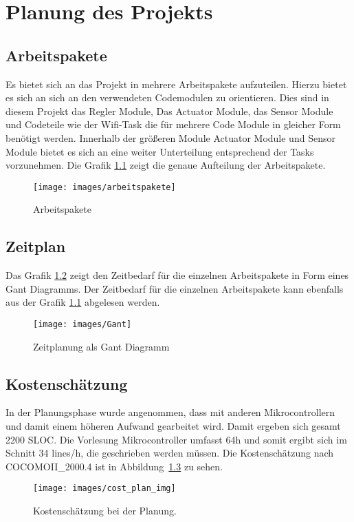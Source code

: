 \chapter{Planung des Projekts}
\label{cha:Planung}

\section{Arbeitspakete}

Es bietet sich an das Projekt in mehrere Arbeitspakete aufzuteilen. Hierzu bietet es sich an sich an den verwendeten Codemodulen zu orientieren. Dies sind in diesem Projekt das Regler Module, Das Actuator Module, das Sensor Module und Codeteile wie der Wifi-Task die für mehrere Code Module in gleicher Form benötigt werden. Innerhalb der größeren Module Actuator Module und Sensor Module bietet es sich an eine weiter Unterteilung entsprechend der Tasks vorzunehmen. Die Grafik \ref{fig:arbeitspakete} zeigt die genaue Aufteilung der Arbeitspakete.

\begin{figure}[hbt]
	\centering
	\texttt{[image: images/arbeitspakete]}
	\caption[Arbeitspakete]{Arbeitspakete}
	\label{fig:arbeitspakete}
\end{figure}

\section{Zeitplan}
Das Grafik \ref{fig:time_plan} zeigt den Zeitbedarf für die einzelnen Arbeitspakete in Form eines Gant Diagramms. Der Zeitbedarf für die einzelnen Arbeitspakete kann ebenfalls aus der Grafik \ref{fig:arbeitspakete} abgelesen werden.

\begin{figure}[hbt]
	\centering
	\texttt{[image: images/Gant]}
	\caption[Zeitplanung als Gant Diagramm]{Zeitplanung als Gant Diagramm}
	\label{fig:time_plan}
\end{figure}


\section{Kostenschätzung}
\label{cha:Planung_cost}
In der Planungsphase wurde angenommen, dass mit anderen Mikrocontrollern und damit einem höheren Aufwand gearbeitet wird. Damit ergeben sich gesamt 2200 SLOC. Die Vorlesung Mikrocontroller umfasst 64h und somit ergibt sich im Schnitt 34 lines/h, die geschrieben werden müssen. Die Kostenschätzung nach COCOMOII\_2000.4 ist in Abbildung~\ref{fig:cost_plan} zu sehen.

\begin{figure}[hbt]
	\centering
	\texttt{[image: images/cost\_plan\_img]}
	\caption[Kostenschätzung Planung]{Kostenschätzung bei der Planung.}
	\label{fig:cost_plan}
\end{figure}